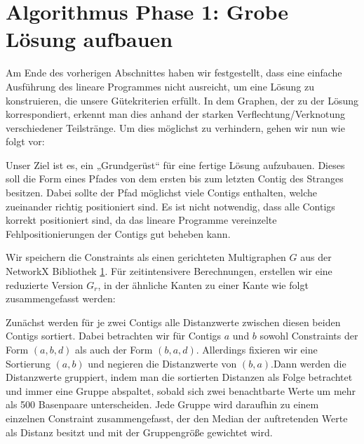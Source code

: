 



\newpage
\chapter{Algorithmus Phase 1: Grobe Lösung aufbauen}

Am Ende des vorherigen Abschnittes haben wir festgestellt, dass eine einfache Ausführung des lineare Programmes nicht ausreicht, um eine Lösung zu konstruieren, die unsere Gütekriterien erfüllt. 
In dem Graphen, der zu der Lösung korrespondiert, erkennt man dies anhand der starken Verflechtung/Verknotung verschiedener Teilstränge. Um dies möglichst zu verhindern, gehen wir nun wie folgt vor:

Unser Ziel ist es, ein „Grundgerüst“ für eine fertige Lösung aufzubauen.
Dieses soll die Form eines Pfades von dem ersten bis zum letzten Contig des Stranges besitzen.
Dabei sollte der Pfad möglichst viele Contigs enthalten, welche zueinander richtig positioniert sind.
Es ist nicht notwendig, dass alle Contigs korrekt positioniert sind, da das lineare Programme vereinzelte Fehlpositionierungen der Contigs gut beheben kann. 


Wir speichern die Constraints als einen gerichteten Multigraphen $G$ aus der NetworkX Bibliothek \ref{}.
Für zeitintensivere Berechnungen, erstellen wir eine reduzierte Version $G_r$, in der ähnliche Kanten 
zu einer Kante wie folgt zusammengefasst werden:

Zunächst werden für je zwei Contigs alle Distanzwerte zwischen diesen beiden Contigs sortiert. Dabei betrachten wir für Contigs $a$ und $b$ sowohl Constraints der Form $(a, b, d)$ als auch der Form $(b, a, d)$. Allerdings fixieren wir eine Sortierung $(a, b)$ und negieren die Distanzwerte von $(b, a)$.Dann werden die Distanzwerte gruppiert, indem man die sortierten Distanzen als Folge betrachtet und immer eine Gruppe abspaltet, sobald sich zwei benachtbarte Werte um mehr als 500 Basenpaare unterscheiden. Jede Gruppe wird daraufhin zu einem einzelnen Constraint zusammengefasst, der den Median der auftretenden Werte als Distanz besitzt und mit der Gruppengröße gewichtet wird.

